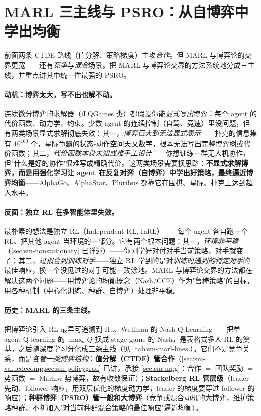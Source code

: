 \section{MARL 三主线与 PSRO：从自博弈中学出均衡}
\label{sec:sm-psro}

前面两条 CTDE 路线（值分解、策略梯度）主攻\emph{合作}。但 MARL 与博弈论的交界更宽——还有\emph{竞争}与\emph{混合}场景。把 MARL 与博弈论交界的方法系统地分成三主线，并重点讲其中统一性最强的 PSRO。

\paragraph{动机：博弈太大，写不出也解不动。}
连续微分博弈的求解器（iLQGames 类）都假设你能\emph{显式写出}博弈：每个 agent 的代价函数、动力学、约束。少数 agent 的连续控制（自驾、竞速）里没问题，但有两类场景显式求解彻底失效：其一，\emph{博弈巨大到无法显式表示}——扑克的信息集有 $10^{160}$ 个，星际争霸的状态-动作空间天文数字，根本无法写出完整博弈树或代价函数；其二，\emph{代价函数本身未知或难手工设计}——你想训练一群无人机协作，但"什么是好的协作"很难写成精确代价。这两类场景需要换思路：\textbf{不显式求解博弈，而是用强化学习让 agent 在反复对弈（自博弈）中学出好策略，最终逼近博弈均衡}——AlphaGo、AlphaStar、Pluribus 都靠它在围棋、星际、扑克上达到超人水平。

\paragraph{反面：独立 RL 在多智能体里失效。}
最朴素的想法是独立 RL（Independent RL, InRL）——每个 agent 各自跑一个 RL、把其他 agent 当环境的一部分。它有两个根本问题：其一，\emph{环境非平稳}（\cref{sec:sm-nonstationary} 已详述）——你刚学好对付对手当前策略，对手就变了；其二，\emph{过拟合到训练对手}——独立 RL 学到的是对\emph{训练时遇到的特定对手}的最佳响应，换一个没见过的对手可能一败涂地。MARL 与博弈论交界的方法都在解决这两个问题——用博弈论的均衡概念（Nash/CCE）作为"鲁棒策略"的目标，用各种机制（中心化训练、种群、自博弈）处理非平稳。

\paragraph{历史：MARL 的三条主线。}
把博弈论引入 RL 最早可追溯到 Hu、Wellman 的 Nash Q-Learning\cite{hu2003nashq}——把单 agent Q-learning 的 $\max_a Q$ 换成 stage game 的 Nash，是表格式多人 RL 的奠基。之后随深度学习分化成三条主线（见 \cref{tab:sm-marl-lines}）。它们不是竞争关系，而是\emph{各管一类博弈结构}：\textbf{值分解（CTDE）管合作}（\cref{sec:sm-valuedecomp,sec:sm-policygrad} 已讲，承接 \cref{sec:sm-mpg}：合作 $=$ 团队奖励 $=$ 势函数 $=$ Markov 势博弈，故有收敛保证）；\textbf{Stackelberg RL 管层级}（leader 先动、follower 响应，用双层优化的梯度动力学，leader 的梯度要穿过 follower 的响应）；\textbf{种群博弈（PSRO）管一般和大博弈}（竞争或混合动机的大博弈，维护策略种群、不断加入"对当前种群混合策略的最佳响应"逼近均衡）。


